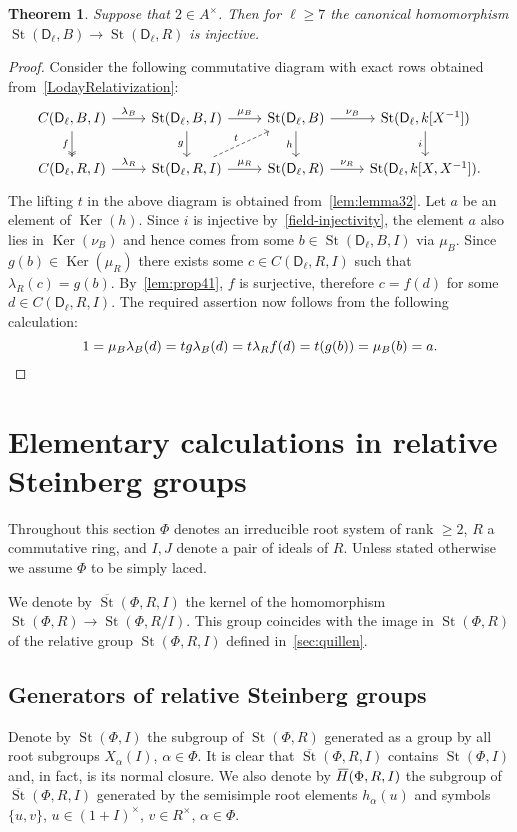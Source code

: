 \documentclass[oneside, 8pt]{amsart}
\newtheorem{theorem}{Theorem}
\theoremstyle{remark}
\theoremstyle{definition}
\numberwithin{lemma}{section}
\numberwithin{prop}{section}
\numberwithin{corollary}{section}
\numberwithin{externaltheorem}{section}
\DeclareMathOperator{\Ker}{Ker}
\DeclareMathOperator{\St}{St}
\newcommand{\myol}[2][3]{{}\mkern#1mu\overline{\mkern-#1mu#2}}
\newcommand{\rD}{\mathsf{D}}
\numberwithin{equation}{section}
\begin{document}
\begin{theorem} \label{thm41} Suppose that $2 \in A^\times$. Then for $\ell \geq 7$ the canonical homomorphism $\St(\rD_\ell, B) \to \St(\rD_\ell, R)$ is injective. \end{theorem}
\begin{proof}
 Consider the following commutative diagram with exact rows obtained from~\eqref{LodayRelativization}:
\[\begin{tikzcd} C(\rD_\ell, B, I) \arrow{r}{\lambda_B} \arrow[d, swap, "f", twoheadrightarrow] & \St(\rD_\ell, B, I) \arrow{r}{\mu_B} \arrow{d}[swap]{g} & \St(\rD_\ell, B) \arrow{r}{\nu_B} \arrow{d}[swap]{h} & \St(\rD_\ell, k[X^{-1}]) \arrow{d}[swap]{i} \\ C(\rD_\ell, R, I) \arrow{r}{\lambda_R} & \St(\rD_\ell, R, I) \arrow{r}{\mu_R} \arrow[ur, "t", dashrightarrow] & \St(\rD_\ell, R) \arrow{r}{\nu_R} & \St(\rD_\ell, k[X, X^{-1}]).\end{tikzcd}\]
The lifting $t$ in the above diagram is obtained from~\cref{lem:lemma32}.
Let $a$ be an element of $\Ker(h)$. Since $i$ is injective by~\cref{field-injectivity}, the element $a$
 also lies in $\Ker(\nu_B)$ and hence comes from some $b \in \St(\rD_\ell, B, I)$ via $\mu_B$.
Since $g(b) \in \Ker(\mu_R)$ there exists some $c \in C(\rD_\ell, R, I)$ such that $\lambda_R(c) = g(b)$. 
By~\cref{lem:prop41}, $f$ is surjective, therefore $c = f(d)$ for some $d \in C(\rD_\ell, R, I)$.
The required assertion now follows from the following calculation:
 \[ 1 = \mu_B\lambda_B(d) = tg\lambda_B(d) = t\lambda_Rf(d) =t(g(b)) = \mu_B(b) = a. \qedhere \]
\end{proof}

\section{Elementary calculations in relative Steinberg groups}\label{sec:elementary}
Throughout this section $\Phi$ denotes an irreducible root system of rank $\geq 2$, $R$ a commutative ring, and $I, J$ denote a pair of ideals of $R$.
Unless stated otherwise we assume $\Phi$ to be simply laced.

We denote by $\overline{\St}(\Phi, R, I)$ the kernel of the homomorphism $\St(\Phi, R) \to \St(\Phi, R/I)$.
This group coincides with the image in $\St(\Phi, R)$ of the relative group $\St(\Phi, R, I)$ defined in~\cref{sec:quillen}.

\subsection{Generators of relative Steinberg groups}
Denote by $\St(\Phi, I)$ the subgroup of $\St(\Phi, R)$ generated as a group by all root subgroups $X_\alpha(I)$, $\alpha\in\Phi$.
It is clear that $\overline{\St}(\Phi, R, I)$ contains $\St(\Phi, I)$ and, in fact, is its normal closure.
We also denote by $\myol{H}(\Phi, R, I)$ the subgroup of $\overline{\St}(\Phi, R, I)$ generated by the semisimple root elements $h_\alpha(u)$ and symbols $\{u, v\}$, $u \in (1+I)^\times$, $v \in R^\times$, $\alpha\in \Phi$.
\end{document}
